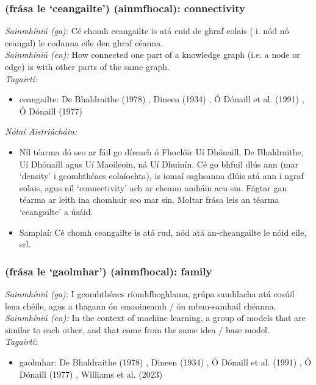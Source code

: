 \documentclass{article}
\begin{document}
\subsubsection*{(frása le `ceangailte') (ainmfhocal): connectivity}
 \noindent \textit{Sainmhíniú (ga):} Cé chomh ceangailte is atá cuid de ghraf eolais (.i. nód nó ceangal) le codanna eile den ghraf céanna.
\\
 \noindent \textit{Sainmhíniú (en):} How connected one part of a knowledge graph (i.e. a node or edge) is with other parts of the same graph.
\\
 \noindent \textit{Tagairtí:}
\begin{itemize}
	\item ceangailte: De Bhaldraithe (1978) \cite{de-bhaldraithe}, Dineen (1934) \cite{dineen}, Ó Dónaill et al. (1991) \cite{focloir-beag}, Ó Dónaill (1977) \cite{odonaill}
\end{itemize}

 \noindent \textit{Nótaí Aistriúcháin:}
\begin{itemize}
	\item Níl téarma dó seo ar fáil go díreach ó Fhoclóir Uí Dhónaill, De Bhaldraithe, Uí Dhónaill agus Uí Maoileoin, ná Uí Dhuinín. Cé go bhfuil dlús ann (mar `density' i gcomhthéacs eolaíochta), is iomaí saghsanna dlúis atá ann i ngraf eolais, agus níl `connectivity' ach ar cheann amháin acu sin. Fágtar gan téarma ar leith ina chomhair seo mar sin. Moltar frása leis an téarma `ceangailte' a úsáid.
	\item Samplaí: Cé chomh ceangailte is atá rud, nód atá an-cheangailte le nóid eile, srl.
\end{itemize}


\subsubsection*{(frása le `gaolmhar') (ainmfhocal): family}
 \noindent \textit{Sainmhíniú (ga):} I gcomhthéacs ríomhfhoghlama, grúpa samhlacha atá cosúil lena chéile, agus a thagann ón smaoineamh / ón mbun-samhail chéanna.
\\
 \noindent \textit{Sainmhíniú (en):} In the context of machine learning, a group of models that are similar to each other, and that come from the same idea / base model.
\\
 \noindent \textit{Tagairtí:}
\begin{itemize}
	\item gaolmhar: De Bhaldraithe (1978) \cite{de-bhaldraithe}, Dineen (1934) \cite{dineen}, Ó Dónaill et al. (1991) \cite{focloir-beag}, Ó Dónaill (1977) \cite{odonaill}, Williams et al. (2023) \cite{storchiste}
\end{itemize}
\end{document}
